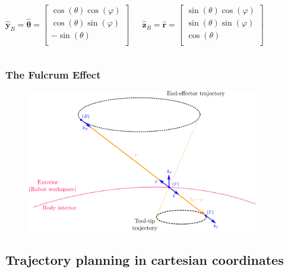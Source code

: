 \begin{frame}
\begin{columns}
\[
\hat{\mathbf{y}}^{}_B = \hat{\mathbf{\theta}}
= \begin{bmatrix}
\cos(θ)\cos(φ) \\
\cos(θ)\sin(φ) \\
- \sin(θ) \\
\end{bmatrix}
\]

\[
\hat{\mathbf{z}}^{}_B = \hat{\mathbf{r}}
= \begin{bmatrix}
\sin(θ)\cos(φ) \\
\sin(θ)\sin(φ) \\
\cos(θ) \\
\end{bmatrix}
\]

\end{columns}
\end{frame}

\begin{frame}
\frametitle{The Fulcrum Effect}
\begin{center}
\begin{figure}[!htb]
\centering
\includegraphics[width=0.9\textwidth]{../images/circular-trajectory-wrt-fulcrum.png}\\
\end{figure}
\end{center}
\end{frame}

\subsection{Trajectory planning in cartesian coordinates}

